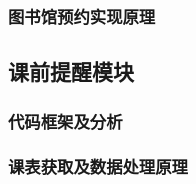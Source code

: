 \documentclass[14pt,a4paper,UTF8,twoside]{article}
\begin{document}
\subsubsection{图书馆预约实现原理}

\subsection{课前提醒模块}

\subsubsection{代码框架及分析}

\subsubsection{课表获取及数据处理原理}
\end{document}
